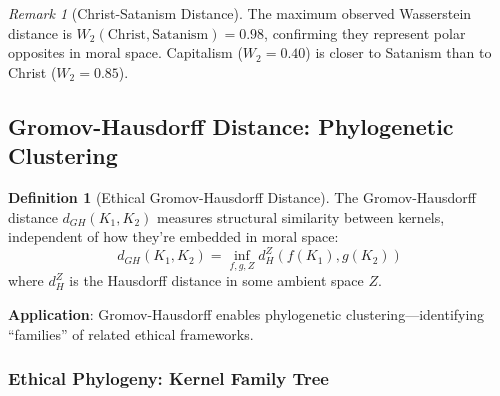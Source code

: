 \documentclass[11pt,a4paper]{article}
\theoremstyle{definition}
\newtheorem{definition}[theorem]{Definition}
\theoremstyle{remark}
\newtheorem{remark}{Remark}
\begin{document}
\begin{remark}[Christ-Satanism Distance]
The maximum observed Wasserstein distance is $W_2(\text{Christ}, \text{Satanism}) = 0.98$, confirming they represent polar opposites in moral space. Capitalism ($W_2 = 0.40$) is closer to Satanism than to Christ ($W_2 = 0.85$).
\end{remark}

\subsection{Gromov-Hausdorff Distance: Phylogenetic Clustering}

\begin{definition}[Ethical Gromov-Hausdorff Distance]
\label{def:gromov}
The Gromov-Hausdorff distance $d_{GH}(K_1, K_2)$ measures structural similarity between kernels, independent of how they're embedded in moral space:
\begin{equation}
    d_{GH}(K_1, K_2) = \inf_{f, g, Z} d_H^Z(f(K_1), g(K_2))
    \label{eq:gromov}
\end{equation}
where $d_H^Z$ is the Hausdorff distance in some ambient space $Z$.
\end{definition}

\textbf{Application}: Gromov-Hausdorff enables phylogenetic clustering---identifying ``families'' of related ethical frameworks.

\subsubsection{Ethical Phylogeny: Kernel Family Tree}
\end{document}
